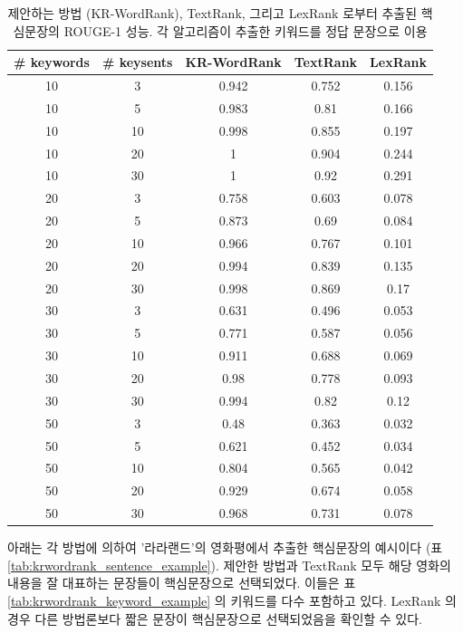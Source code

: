 \documentclass[11pt]{article}
\begin{document}
\begin{table}[H]
\centering
\small
\label{tab:krwordrank_sentence_performance}
\caption{제안하는 방법 (KR-WordRank), TextRank, 그리고 LexRank 로부터 추출된 핵심문장의 ROUGE-1 성능. 각 알고리즘이 추출한 키워드를 정답 문장으로 이용}
\begin{tabular}{|c|c|c|c|c|}
\hline
\textbf{\# keywords} & \textbf{\# keysents} & \textbf{KR-WordRank} & \textbf{TextRank} & \textbf{LexRank} \\ \hline
10 & 3 & 0.942 & 0.752 & 0.156 \\ \hline
10 & 5 & 0.983 & 0.81 & 0.166 \\ \hline
10 & 10 & 0.998 & 0.855 & 0.197 \\ \hline
10 & 20 & 1 & 0.904 & 0.244 \\ \hline
10 & 30 & 1 & 0.92 & 0.291 \\ \hline
20 & 3 & 0.758 & 0.603 & 0.078 \\ \hline
20 & 5 & 0.873 & 0.69 & 0.084 \\ \hline
20 & 10 & 0.966 & 0.767 & 0.101 \\ \hline
20 & 20 & 0.994 & 0.839 & 0.135 \\ \hline
20 & 30 & 0.998 & 0.869 & 0.17 \\ \hline
30 & 3 & 0.631 & 0.496 & 0.053 \\ \hline
30 & 5 & 0.771 & 0.587 & 0.056 \\ \hline
30 & 10 & 0.911 & 0.688 & 0.069 \\ \hline
30 & 20 & 0.98 & 0.778 & 0.093 \\ \hline
30 & 30 & 0.994 & 0.82 & 0.12 \\ \hline
50 & 3 & 0.48 & 0.363 & 0.032 \\ \hline
50 & 5 & 0.621 & 0.452 & 0.034 \\ \hline
50 & 10 & 0.804 & 0.565 & 0.042 \\ \hline
50 & 20 & 0.929 & 0.674 & 0.058 \\ \hline
50 & 30 & 0.968 & 0.731 & 0.078 \\ \hline
\end{tabular}
\end{table}

아래는 각 방법에 의하여 '라라랜드'의 영화평에서 추출한 핵심문장의 예시이다 (표 \ref{tab:krwordrank_sentence_example}).
제안한 방법과 TextRank 모두 해당 영화의 내용을 잘 대표하는 문장들이 핵심문장으로 선택되었다.
이들은 표 \ref{tab:krwordrank_keyword_example} 의 키워드를 다수 포함하고 있다.
LexRank 의 경우 다른 방법론보다 짧은 문장이 핵심문장으로 선택되었음을 확인할 수 있다.
\end{document}
